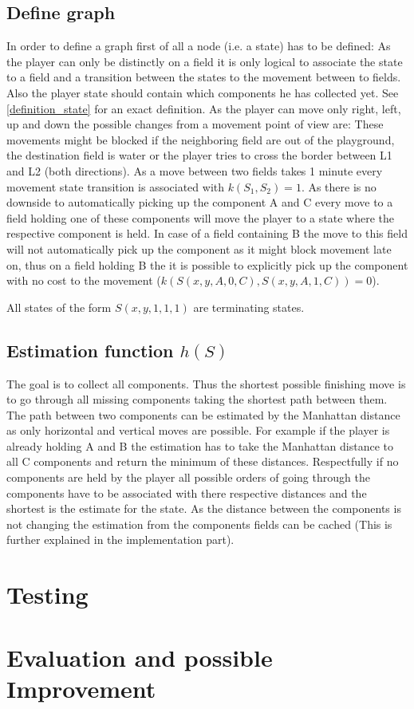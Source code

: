 \documentclass{article}
\begin{document}
\subsection{Define graph}
In order to define a graph first of all a node (i.e. a state) has to be defined: As the player can only be distinctly on a field it is only logical to associate the state to a field and a transition between the states to the movement between to fields. Also the player state should contain which components he has collected yet. See \ref{definition_state} for an exact definition. As the player can move only right, left, up and down the possible changes from a movement point of view are:
These movements might be blocked if the neighboring field are out of the playground, the destination field is water or the player tries to cross the border between L1 and L2 (both directions).
As a move between two fields takes 1 minute every movement state transition is associated with $k(S_1, S_2) = 1$.
As there is no downside to automatically picking up the component A and C every move to a field holding one of these components will move the player to a state where the respective component is held. In case of a field containing B the move to this field will not automatically pick up the component as it might block movement late on, thus on a field holding B the it is possible to explicitly pick up the component with no cost to the movement ($k(S(x,y,A,0,C), S(x,y,A,1,C)) = 0$).

All states of the form $S(x,y,1,1,1)$ are terminating states.

\subsection{Estimation function $h(S)$}
The goal is to collect all components. Thus the shortest possible finishing move is to go through all missing components taking the shortest path between them. The path between two components can be estimated by the Manhattan distance as only horizontal and vertical moves are possible. For example if the player is already holding A and B the estimation has to take the Manhattan distance to all C components and return the minimum of these distances. Respectfully if no components are held by the player all possible orders of going through the components have to be associated with there respective distances and the shortest is the estimate for the state. As the distance between the components is not changing the estimation from the components fields can be cached (This is further explained in the implementation part). %


\section{Testing}

\section{Evaluation and possible Improvement}
\end{document}
